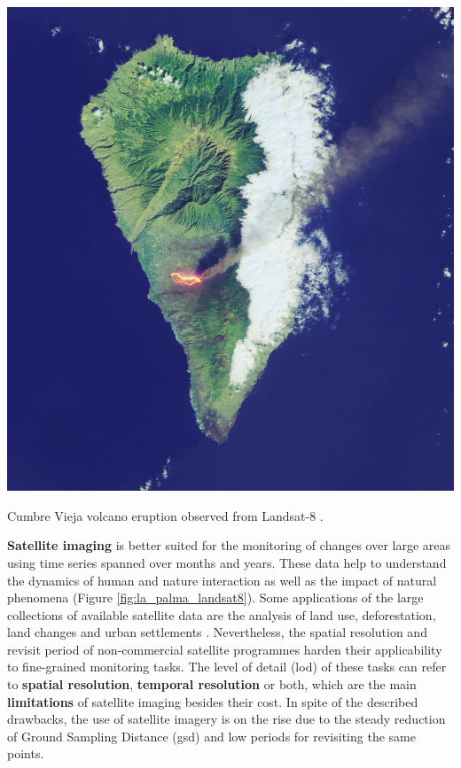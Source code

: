 \begin{marginfigure}[0cm]
	\includegraphics{figs/introduction/landsat8_lapalma.jpg}
	\caption{Cumbre Vieja volcano eruption observed from Landsat-8 \cite{nasa_earth_observatory_lava_2021}.}
	\label{fig:la_palma_landsat8}
\end{marginfigure}
\textbf{Satellite imaging} is better suited for the monitoring of changes over large areas using time series spanned over months and years. These data help to understand the dynamics of human and nature interaction as well as the impact of natural phenomena (Figure \ref{fig:la_palma_landsat8}). Some applications of the large collections of available satellite data are the analysis of land use, deforestation, land changes and urban settlements \cite{asokan_change_2019}. Nevertheless, the spatial resolution and revisit period of non-commercial satellite programmes harden their applicability to fine-grained monitoring tasks. The level of detail (\acrshort{lod}) of these tasks can refer to \textbf{spatial resolution}, \textbf{temporal resolution} or both, which are the main \textbf{limitations} of satellite imaging besides their cost. In spite of the described drawbacks, the use of satellite imagery is on the rise due to the steady reduction of Ground Sampling Distance (\acrshort{gsd}) and low periods for revisiting the same points. 


